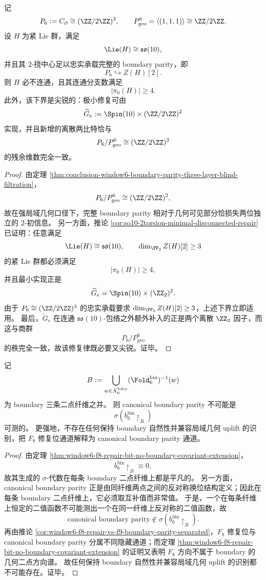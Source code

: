 \begin{theorem}\label{thm:conclusion-window6-boundary-parity-lie-repair-two-bits}
记
\[
P_6:=C_{\partial}\cong (\ZZ/2\ZZ)^3,
\qquad
P_{\mathrm{geo}}^6=\langle(1,1,1)\rangle\cong \ZZ/2\ZZ.
\]
设 \(H\) 为紧 Lie 群，满足
\[
\Lie(H)\cong \mathfrak{so}(10),
\]
并且其 \(2\)-挠中心足以忠实承载完整的 boundary parity，即
\[
P_6\hookrightarrow Z(H)[2].
\]
则 \(H\) 必不连通，且其连通分支数满足
\[
|\pi_0(H)|\ge 4.
\]
此外，该下界是尖锐的：极小修复可由
\[
\widetilde G_e:=\Spin(10)\times (\ZZ/2\ZZ)^2
\]
实现，并且新增的离散两比特恰与
\[
P_6/P_{\mathrm{geo}}^6\cong (\ZZ/2\ZZ)^2
\]
的残余维数完全一致。
\end{theorem}
\begin{proof}
由定理 \ref{thm:conclusion-window6-boundary-parity-three-layer-blind-filtration}，
\[
P_6/P_{\mathrm{geo}}^6\cong (\ZZ/2\ZZ)^2,
\]
故在强局域几何口径下，完整 boundary parity 相对于几何可见部分恰损失两位独立的 \(2\)-初信息。
另一方面，推论 \ref{cor:so10-2torsion-minimal-disconnected-repair} 已证明：任意满足
\[
\Lie(H)\cong \mathfrak{so}(10),
\qquad
\dim_{\FF_2}Z(H)[2]\ge 3
\]
的紧 Lie 群都必须满足
\[
|\pi_0(H)|\ge 4,
\]
并且最小实现正是
\[
\widetilde G_e=\Spin(10)\times (\ZZ_2)^2.
\]
由于 \(P_6\cong (\ZZ/2\ZZ)^3\) 的忠实承载要求 \(\dim_{\FF_2}Z(H)[2]\ge 3\)，上述下界立即适用。
最后，\(\widetilde G_e\) 在连通 \(\mathfrak{so}(10)\)-包络之外额外补入的正是两个离散 \(\ZZ_2\) 因子，而这与商群
\[
P_6/P_{\mathrm{geo}}^6
\]
的秩完全一致，故该修复律既必要又尖锐。证毕。
\end{proof}

\begin{theorem}\label{thm:conclusion-window6-boundary-parity-not-measurable-from-f8}
记
\[
B:=\bigcup_{w\in X_6^{\mathrm{bdry}}}(\Fold_6^{\mathrm{bin}})^{-1}(w)
\]
为 boundary 三条二点纤维之并。
则 canonical boundary parity 不可能是
\[
\sigma\!\left(b_6^{\mathrm{bin}}\!\restriction_B\right)
\]
可测的。
更强地，不存在任何保持 boundary 自然性并兼容局域几何 uplift 的识别，把 \(F_8\) 修复位通道解释为 canonical boundary parity 通道。
\end{theorem}
\begin{proof}
由定理 \ref{thm:window6-f8-repair-bit-no-boundary-covariant-extension}，
\[
b_6^{\mathrm{bin}}\!\restriction_B\equiv 0,
\]
故其生成的 \(\sigma\)-代数在每条 boundary 二点纤维上都是平凡的。
另一方面，canonical boundary parity 正是由同纤维两点之间的反对称换位结构定义；因此在每条 boundary 二点纤维上，它必须取互补值而非常值。
于是，一个在每条纤维上恒定的二值函数不可能测出一个在同一纤维上反对称的二值函数，故
\[
\text{canonical boundary parity}\notin \sigma\!\left(b_6^{\mathrm{bin}}\!\restriction_B\right).
\]
再由推论 \ref{cor:window6-f8-repair-vs-f9-boundary-parity-separated}，\(F_8\) 修复位与 canonical boundary parity 分属不同隐藏通道；而定理 \ref{thm:window6-f8-repair-bit-no-boundary-covariant-extension} 的证明又表明 \(F_8\) 方向不属于 boundary 的几何二点方向谱。
故任何保持 boundary 自然性并兼容局域几何 uplift 的识别都不可能存在。证毕。
\end{proof}

